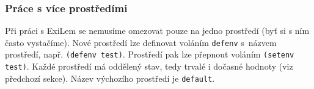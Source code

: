 \subsubsection{Práce s více prostředími}
\label{multiple environments}
Při práci s ExiLem se nemusíme omezovat pouze na jedno prostředí (byť si s ním
často vystačíme). Nové prostředí lze definovat voláním \verb|defenv| s~názvem
prostředí, např. \verb|(defenv test)|. Prostředí pak lze přepnout voláním
\verb|(setenv test)|. Každé prostředí má oddělený stav, tedy trvalé i dočasné
hodnoty (viz předchozí sekce). Název výchozího prostředí je \verb|default|.
